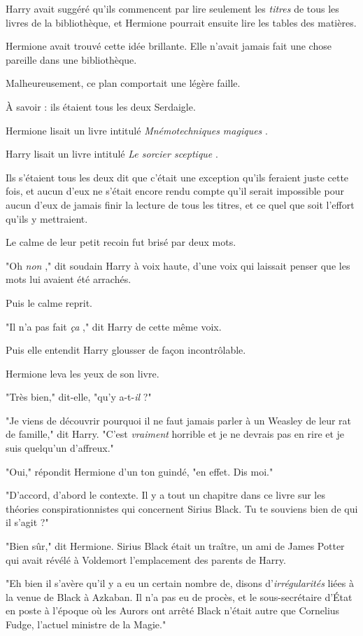 Harry avait suggéré qu'ils commencent par lire seulement les \emph{titres}  de tous les livres de la bibliothèque, et Hermione pourrait ensuite lire les tables des matières.

Hermione avait trouvé cette idée brillante. Elle n'avait jamais fait une chose pareille dans une bibliothèque.

Malheureusement, ce plan comportait une légère faille.

À savoir : ils étaient tous les deux Serdaigle.

Hermione lisait un livre intitulé \emph{Mnémotechniques magiques} .

Harry lisait un livre intitulé \emph{Le sorcier sceptique} .

Ils s'étaient tous les deux dit que c'était une exception qu'ils feraient juste cette fois, et aucun d'eux ne s'était encore rendu compte qu'il serait impossible pour aucun d'eux de jamais finir la lecture de tous les titres, et ce quel que soit l'effort qu'ils y mettraient.

Le calme de leur petit recoin fut brisé par deux mots.

"Oh \emph{non} ," dit soudain Harry à voix haute, d'une voix qui laissait penser que les mots lui avaient été arrachés.

Puis le calme reprit.

"Il n'a pas fait \emph{ça} ," dit Harry de cette même voix.

Puis elle entendit Harry glousser de façon incontrôlable.

Hermione leva les yeux de son livre.

"Très bien," dit-elle, "qu'y a-t-\emph{il}  ?"

"Je viens de découvrir pourquoi il ne faut jamais parler à un Weasley de leur rat de famille," dit Harry. "C'est \emph{vraiment}  horrible et je ne devrais pas en rire et je suis quelqu'un d'affreux."

"Oui," répondit Hermione d'un ton guindé, "en effet. Dis moi."

"D'accord, d'abord le contexte. Il y a tout un chapitre dans ce livre sur les théories conspirationnistes qui concernent Sirius Black. Tu te souviens bien de qui il s'agit ?"

"Bien sûr," dit Hermione. Sirius Black était un traître, un ami de James Potter qui avait révélé à Voldemort l'emplacement des parents de Harry.

"Eh bien il s'avère qu'il y a eu un certain nombre de, disons d'\emph{irrégularités}  liées à la venue de Black à Azkaban. Il n'a pas eu de procès, et le sous-secrétaire d'État en poste à l'époque où les Aurors ont arrêté Black n'était autre que Cornelius Fudge, l'actuel ministre de la Magie."

